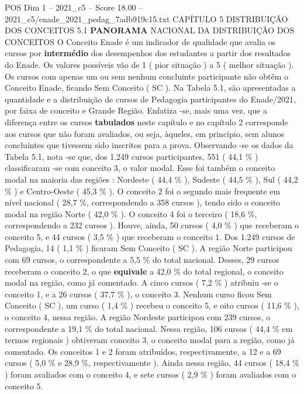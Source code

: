 \begin{textsample}{POS Dim 1 – 2021\_c5 – Score 18.00 – 2021\_c5/enade\_2021\_pedag\_7adb919c15.txt}  \label{ex:f1_pos_032}
CAPÍTULO 5 DISTRIBUIÇÃO DOS CONCEITOS 5.1 \textbf{PANORAMA} NACIONAL DA DISTRIBUIÇÃO DOS CONCEITOS O Conceito Enade é um indicador de qualidade que avalia os cursos por \textbf{intermédio} dos desempenhos dos estudantes a partir dos resultados do Enade.
Os valores possíveis vão de 1 ( pior situação ) a 5 ( melhor situação ).
Os cursos com apenas um ou sem nenhum concluinte participante não obtêm o Conceito Enade, ficando Sem Conceito ( SC ).
Na Tabela 5.1, são apresentadas a quantidade e a distribuição de cursos de Pedagogia participantes do Enade/2021, por faixa de conceito e Grande Região.
Enfatiza -se, mais uma vez, que a diferença entre os cursos \textbf{tabulados} neste capítulo e no capítulo 2 corresponde aos cursos que não foram avaliados, ou seja, àqueles, em princípio, sem alunos concluintes que tivessem sido inscritos para a prova.
Observando -se os dados da Tabela 5.1, nota -se que, dos 1.249 cursos participantes, 551 ( 44,1 \% ) classificaram -se com conceito 3, o valor modal.
Esse foi também o conceito modal na maioria das regiões : Nordeste ( 44,4 \% ), Sudeste ( 44,5 \% ), Sul ( 44,2 \% ) e Centro-Oeste ( 45,3 \% ).
O conceito 2 foi o segundo mais frequente em nível nacional ( 28,7 \%, correspondendo a 358 cursos ), tendo sido o conceito modal na região Norte ( 42,0 \% ).
O conceito 4 foi o terceiro ( 18,6 \%, correspondendo a 232 cursos ).
Houve, ainda, 50 cursos ( 4,0 \% ) que receberam o conceito 5, e 44 cursos ( 3,5 \% ) que receberam o conceito 1.
Dos 1.249 cursos de Pedagogia, 14 ( 1,1 \% ) ficaram Sem Conceito ( SC ).
A região Norte participou com 69 cursos, o correspondente a 5,5 \% do total nacional.
Desses, 29 cursos receberam o conceito 2, o que \textbf{equivale} a 42,0 \% do total regional, o conceito modal na região, como já comentado.
A cinco cursos ( 7,2 \% ) atribuiu -se o conceito 1, e a 26 cursos ( 37,7 \% ), o conceito 3.
Nenhum curso ficou Sem Conceito ( SC ), um curso ( 1,4 \% ) recebeu o conceito 5, e oito cursos ( 11,6 \% ), o conceito 4, nessa região.
A região Nordeste participou com 239 cursos, o correspondente a 19,1 \% do total nacional.
Nessa região, 106 cursos ( 44,4 \% em termos regionais ) obtiveram conceito 3, o conceito modal para a região, como já comentado.
Os conceitos 1 e 2 foram atribuídos, respectivamente, a 12 e a 69 cursos ( 5,0 \% e 28,9 \%, respectivamente ).
Ainda nessa região, 44 cursos ( 18,4 \% ) foram avaliados com o conceito 4, e sete cursos ( 2,9 \% ) foram avaliados com o conceito 5.

\end{textsample}
